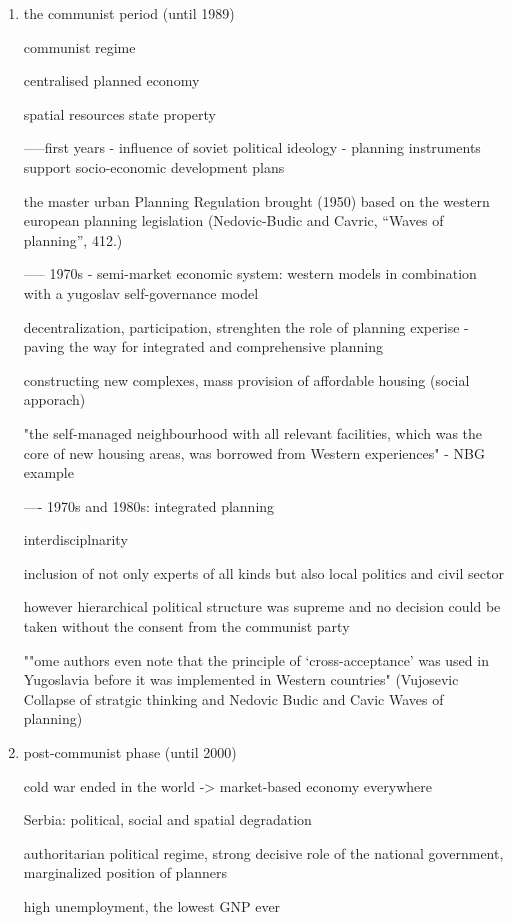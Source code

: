 \documentclass[11pt]{report}
\begin{document}
\begin{enumerate}
\item the communist period (until 1989)

communist regime

centralised planned economy

spatial resources state property

-----first years - influence of soviet political ideology - planning instruments support socio-economic development plans

the master urban Planning Regulation brought (1950) based on the western european planning legislation (Nedovic-Budic and Cavric, “Waves of planning”, 412.)

----- 1970s - semi-market economic system: western models in combination with a yugoslav self-governance model

decentralization, participation, strenghten the role of planning experise - paving the way for integrated and comprehensive planning

constructing new complexes, mass provision of affordable housing (social apporach)

"the self-managed neighbourhood with all relevant facilities, which was the core of new housing areas, was borrowed from Western experiences" - NBG example

---- 1970s and 1980s:
 integrated planning

interdisciplnarity

inclusion of not only experts of all kinds but also local politics and civil sector

however hierarchical political structure was supreme and no decision could be taken without the consent from the communist party

""ome authors even note that the principle of ‘cross-acceptance’ was used in Yugoslavia before it was implemented in Western countries"  (Vujosevic Collapse of stratgic thinking and Nedovic Budic and Cavic Waves of planning)

\item post-communist phase (until 2000)

cold war ended in the world -> market-based economy everywhere

Serbia: political, social and spatial degradation

authoritarian political regime, strong decisive role of the national government, marginalized position of planners

high unemployment, the lowest GNP ever


\end{enumerate}
\end{document}

